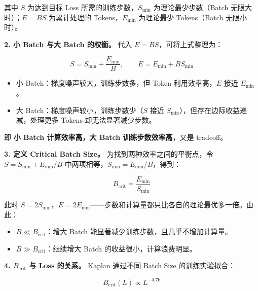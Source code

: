 \documentclass[
  11pt,
  a4paper,
  fontset=none]{ctexart}
\providecommand{\tightlist}{%
  \setlength{\itemsep}{0pt}\setlength{\parskip}{0pt}}
\newenvironment{NotesFormula}{%
  \par\noindent\begin{minipage}{\linewidth}%
  \setlength{\parindent}{2em}%
  \setlength{\parskip}{0.35em}%
}{\end{minipage}\par}
\begin{document}
其中 \(S\) 为达到目标 Loss 所需的训练步数，\(S_{\min}\)
为理论最少步数（Batch 无限大时）；\(E=BS\) 为累计处理的
Tokens，\(E_{\min}\) 为理论最少 Tokens（Batch 无限小时）。

\begin{NotesFormula}

\textbf{2. 小 Batch 与大 Batch 的权衡。} 代入 \(E=BS\)，可将上式整理为：

\[\boxed{S=S_{\min}+\frac{E_{\min}}{B}},\qquad
\boxed{E=E_{\min}+BS_{\min}}\]

\end{NotesFormula}

\begin{itemize}
\tightlist
\item
  小 Batch：梯度噪声较大，训练步数多，但 Token 利用效率高，\(E\) 接近
  \(E_{\min}\)。
\item
  大 Batch：梯度噪声较小，训练步数少（\(S\) 接近
  \(S_{\min}\)），但存在边际收益递减，处理更多 Tokens
  却无法显著减少步数。
\end{itemize}

即 \textbf{小 Batch 计算效率高，大 Batch 训练步数效率高}，又是
tradeoff。

\begin{NotesFormula}

\textbf{3. 定义 Critical Batch Size。} 为找到两种效率之间的平衡点，令
\(S=S_{\min}+E_{\min}/B\) 中两项相等，\(S_{\min}=E_{\min}/B\)，得到：

\[\boxed{B_{\mathrm{crit}}=\frac{E_{\min}}{S_{\min}}}\]

\end{NotesFormula}

此时
\(S=2S_{\min}\)，\(E=2E_{\min}\)------步数和计算量都只比各自的理论最优多一倍。由此：

\begin{itemize}
\tightlist
\item
  \(B\ll B_{\mathrm{crit}}\)：增大 Batch
  能显著减少训练步数，且几乎不增加计算量。
\item
  \(B\gg B_{\mathrm{crit}}\)：继续增大 Batch 的收益很小，计算浪费明显。
\end{itemize}

\begin{NotesFormula}

\textbf{4. \(B_{\mathrm{crit}}\) 与 Loss 的关系。} Kaplan 通过不同 Batch
Size 的训练实验拟合：

\[\boxed{B_{\mathrm{crit}}(L)\propto L^{-4.76}}\]

\end{NotesFormula}
\end{document}
